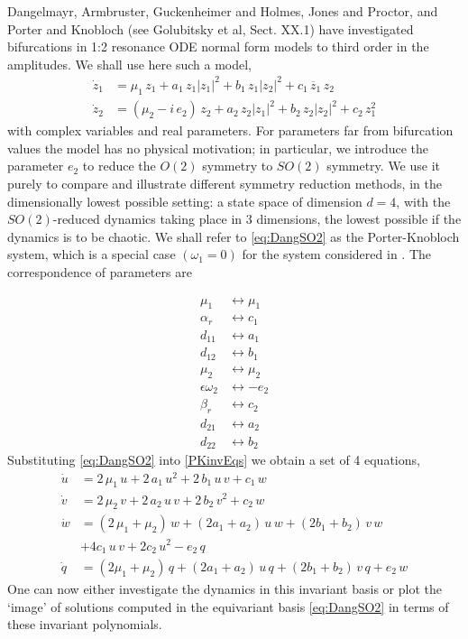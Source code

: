 \documentclass{article}
\begin{document}
Dangelmayr,\cite{Dang86} Armbruster, Guckenheimer and Holmes,\cite{AGHO288}
Jones and Proctor,\cite{JoPro87} and Porter and Knobloch\cite{PoKno05} (see
Golubitsky et al\cite{golubII}, Sect. XX.1) have investigated bifurcations
in 1:2 resonance ODE normal form models to third order in the amplitudes.
We shall use here such a model,
\begin{subequations}\label{eq:DangSO2}
\begin{align}
  \dot{z}_1 &= \mu_1\,z_1+a_1\,z_1|z_1|^2+b_1\,z_1|z_2|^2+c_1\,\overline{z}_1\,z_2\,\\
  \dot{z}_2 &= (\mu_2-i\, e_2)\,{z_2}+a_2\,z_2|z_1|^2+b_2\,z_2|z_2|^2+c_2\,z_1^2
\end{align}
\end{subequations}
with complex variables and real parameters. For parameters
far from bifurcation values the model has no physical motivation; in
particular, we introduce the parameter $e_2$ to reduce the $O(2)$ symmetry to $SO(2)$ symmetry. We use it purely to compare and
illustrate different symmetry reduction methods, in the dimensionally
lowest possible setting: a state space of dimension $d=4$, with the
$SO(2)$-reduced dynamics taking place in 3 dimensions, the lowest
possible if the dynamics is to be chaotic. We shall refer to
\ref{eq:DangSO2} as the Porter-Knobloch system,
which is a special case $(\omega_1=0)$ for the system considered in \cite{??}.
The correspondence of parameters are

\begin{align}
\mu_1&\leftrightarrow\mu_1\\
\alpha_r&\leftrightarrow c_1\\
d_{11}&\leftrightarrow a_1\\
d_{12}&\leftrightarrow b_1\\
\mu_2&\leftrightarrow\mu_2\\
\epsilon\omega_2&\leftrightarrow-e_2\\
\beta_r&\leftrightarrow c_2\\
d_{21}&\leftrightarrow a_2 \\
d_{22}&\leftrightarrow b_2
\end{align}
Substituting
\ref{eq:DangSO2} into \ref{PKinvEqs} we obtain a set of 4 equations,
\begin{equation}
\begin{split}
  \dot{u} &= 2\,\mu_1\,u+2\,a_1\,u^2+2\,b_1\,u\,v+c_1\,w\\
  \dot{v} &= 2\,\mu_2\,v+2\,a_2\,u\,v+2\,b_2\,v^2+c_2\,w\\
  \dot{w} &= (2\,\mu_1+\mu_2)\,w+(2a_1+a_2)\,u\,w+(2b_1+b_2)\,v\,w\\
	&+4c_1\,u\,v + 2c_2\,u^2 - e_2\,q
\label{PKinvEqs1}\\
  \dot{q} &= (2\mu_1+\mu_2)\,q+(2a_1+a_2)\,u\,q+(2b_1+b_2)\,v\,q
             +e_2\,w
\end{split}
\end{equation}
One can now either investigate the dynamics in this invariant basis or
plot the `image'\cite{GL-Gil07b} of solutions computed in the equivariant
basis \ref{eq:DangSO2} in terms of these invariant polynomials.
\end{document}
